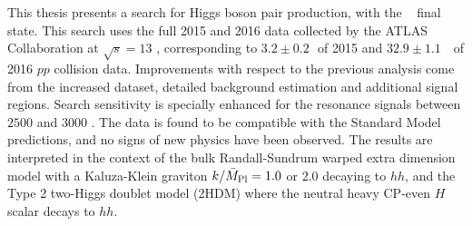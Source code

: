 This thesis presents a search for Higgs boson pair production, with the \bbbb~ final state. 
This search uses the full 2015 and 2016 data collected by the ATLAS Collaboration at $\sqrt{s}=13$ \TeV, corresponding to $3.2 \pm 0.2$\,\ifb\ of 2015 and $32.9 \pm 1.1$\, \ifb\ of 2016 $pp$ collision data.
Improvements with respect to the previous analysis come from the increased dataset, detailed background estimation and additional signal regions.
Search sensitivity is specially enhanced for the resonance signals between $2500$ \GeV and $3000$ \GeV.
The data is found to be compatible with the Standard Model predictions, and no signs of new physics have been observed.
The results are interpreted in the context of the bulk Randall-Sundrum warped extra dimension model with a Kaluza-Klein graviton $k/\bar{M}_{\rm Pl} = 1.0$ or $2.0$ decaying to $hh$, and the Type 2 two-Higgs doublet model (2HDM) where the neutral heavy CP-even $H$ scalar decays to $hh$.
